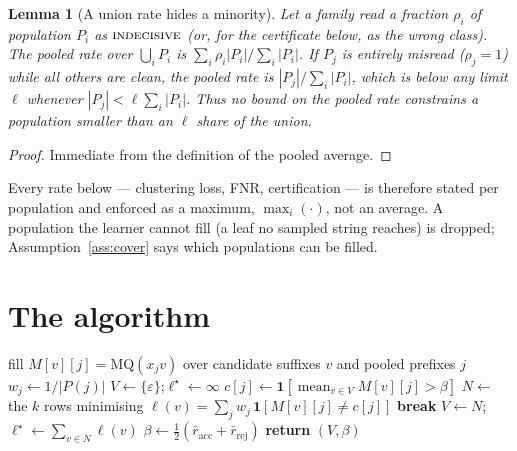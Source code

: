 \documentclass[11pt]{article}
\newtheorem{lemma}{Lemma}
\newcommand{\MQ}{\mathrm{MQ}}
\newcommand{\ind}{\textsc{indecisive}}
\begin{document}
\begin{lemma}[A union rate hides a minority]\label{lem:union}
Let a family read a fraction $\rho_i$ of population $P_i$ as $\ind$ (or, for the
certificate below, as the wrong class). The pooled rate over
$\bigcup_i P_i$ is $\sum_i \rho_i |P_i| / \sum_i |P_i|$. If $P_j$ is entirely
misread ($\rho_j=1$) while all others are clean, the pooled rate is
$|P_j|/\sum_i|P_i|$, which is below any limit $\ell$ whenever
$|P_j| < \ell\sum_i|P_i|$. Thus no bound on the pooled rate constrains a
population smaller than an $\ell$ share of the union.
\end{lemma}
\begin{proof}
Immediate from the definition of the pooled average.
\end{proof}

Every rate below --- clustering loss, FNR, certification --- is therefore stated
per population and enforced as a maximum, $\max_i(\cdot)$, not an average. A
population the learner cannot fill (a leaf no sampled string reaches) is dropped;
Assumption~\ref{ass:cover} says which populations can be filled.

\section{The algorithm}\label{sec:alg}

\begin{algorithm}[h]
\caption{$\textsc{Cluster}(\beta)$: $\varepsilon$-anchored family and refreshed split}
\label{alg:cluster}
\begin{algorithmic}[1]
\State fill $M[v][j]=\MQ(x_j v)$ over candidate suffixes $v$ and pooled prefixes $j$
\State $w_j\gets 1/|P(j)|$ 
\State $V\gets\{\varepsilon\}$;\quad $\ell^\star\gets\infty$
\Loop
  \State $c[j]\gets\mathbf 1[\operatorname{mean}_{v\in V}M[v][j]>\beta]$
  \State $N\gets$ the $k$ rows minimising $\ell(v)=\sum_j w_j\,\mathbf 1[M[v][j]\ne c[j]]$
   \textbf{break}\EndIf
  \State $V\gets N$;\quad $\ell^\star\gets\sum_{v\in N}\ell(v)$
\EndLoop
\State $\beta\gets\tfrac12(\bar r_{\mathrm{acc}}+\bar r_{\mathrm{rej}})$ 
\State \textbf{return }$(V,\beta)$
\end{algorithmic}
\end{algorithm}
\end{document}
